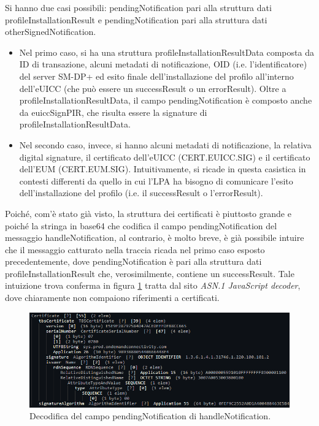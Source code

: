 \documentclass[10pt, oneside]{book}
\begin{document}
\noindent Si hanno due casi possibili: pendingNotification pari alla struttura dati profileInstallationResult e pendingNotification pari alla struttura dati otherSignedNotification.
\begin{itemize}
\item Nel primo caso, si ha una struttura profileInstallationResultData composta da ID di transazione, alcuni metadati di notificazione, OID (i.e. l'identificatore) del server SM-DP+ ed esito finale dell'installazione del profilo all'interno dell'eUICC (che può essere un successResult o un errorResult). Oltre a profileInstallationResultData, il campo pendingNotification è composto anche da euiccSignPIR, che risulta essere la signature di profileInstallationResultData.
\item Nel secondo caso, invece, si hanno alcuni metadati di notificazione, la relativa digital signature, il certificato dell'eUICC (CERT.EUICC.SIG) e il certificato dell'EUM (CERT.EUM.SIG). Intuitivamente, si ricade in questa casistica in contesti differenti da quello in cui l'LPA ha bisogno di comunicare l'esito dell'installazione del profilo (i.e. il successResult o l'errorResult).
\end{itemize}
Poiché, com'è stato già visto, la struttura dei certificati è piuttosto grande e poiché la stringa in base64 che codifica il campo pendingNotification del messaggio handleNotification, al contrario, è molto breve, è già possibile intuire che il messaggio catturato nella traccia ricada nel primo caso esposto precedentemente, dove pendingNotification è pari alla struttura dati profileInstallationResult che, verosimilmente, contiene un successResult. Tale intuizione trova conferma in figura \ref{fig:decode-pendingNotification} tratta dal sito \textit{ASN.1 JavaScript decoder}, dove chiaramente non compaiono riferimenti a certificati.
\begin{figure}
\includegraphics[width=\linewidth]{decode-pendingNotification.png}
\caption{Decodifica del campo pendingNotification di handleNotification.}
\label{fig:decode-pendingNotification}
\end{figure}
\end{document}
